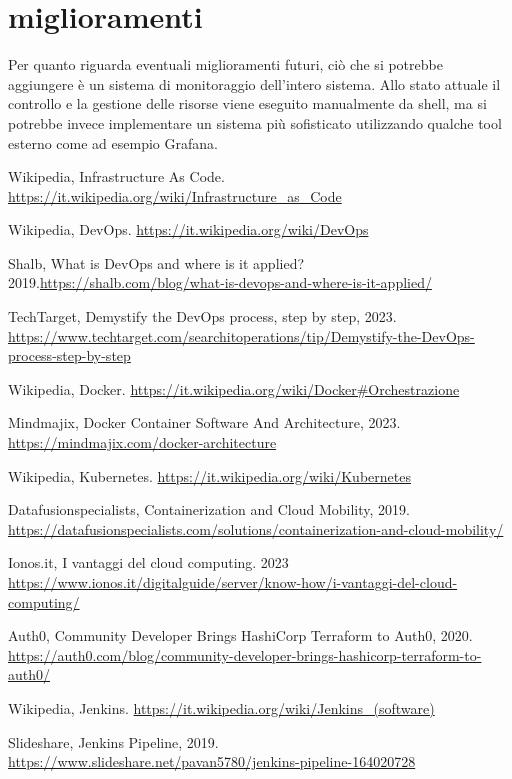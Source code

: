 \documentclass[a4paper,12pt]{report}
\begin{document}
\section{miglioramenti}
Per quanto riguarda eventuali miglioramenti futuri, ciò che si potrebbe aggiungere è un sistema di monitoraggio dell'intero sistema. Allo stato attuale il controllo e la gestione delle risorse viene eseguito manualmente da shell, ma si potrebbe invece implementare un sistema più sofisticato utilizzando qualche tool esterno come ad esempio Grafana.
%
%
\begin{thebibliography}{00}
%
Wikipedia, Infrastructure As Code. \url{https://it.wikipedia.org/wiki/Infrastructure_as_Code}

Wikipedia, DevOps. \url{https://it.wikipedia.org/wiki/DevOps}

Shalb, What is DevOps and where is it applied? 2019.\url{https://shalb.com/blog/what-is-devops-and-where-is-it-applied/}

TechTarget, Demystify the DevOps process, step by step, 2023. \url{https://www.techtarget.com/searchitoperations/tip/Demystify-the-DevOps-process-step-by-step}

Wikipedia, Docker. \url{https://it.wikipedia.org/wiki/Docker#Orchestrazione}

Mindmajix, Docker Container Software And Architecture, 2023. \url{https://mindmajix.com/docker-architecture}

Wikipedia, Kubernetes. \url{https://it.wikipedia.org/wiki/Kubernetes}

Datafusionspecialists, Containerization and Cloud Mobility, 2019. \url{https://datafusionspecialists.com/solutions/containerization-and-cloud-mobility/}

Ionos.it, I vantaggi del cloud computing. 2023 \url{https://www.ionos.it/digitalguide/server/know-how/i-vantaggi-del-cloud-computing/}

Auth0, Community Developer Brings HashiCorp Terraform to Auth0, 2020. \url{https://auth0.com/blog/community-developer-brings-hashicorp-terraform-to-auth0/}

Wikipedia, Jenkins. \url{https://it.wikipedia.org/wiki/Jenkins_(software)}

Slideshare, Jenkins Pipeline, 2019. \url{https://www.slideshare.net/pavan5780/jenkins-pipeline-164020728}

%
%
\end{thebibliography}
% 
\end{document}
